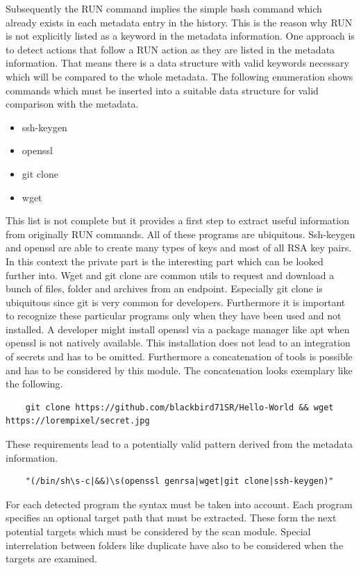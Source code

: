 Subsequently the RUN command implies the simple bash command which already exists in each metadata entry in the history. 
This is the reason why RUN is not explicitly listed as a keyword in the metadata information. 
One approach is to detect actions that follow a RUN action as they are listed in the metadata information. 
That means there is a data structure with valid keywords necessary which will be compared to the whole metadata.
The following enumeration shows commands which must be inserted into a suitable data structure for valid comparison with the metadata.
\begin{itemize}
\item ssh-keygen
\item openssl
\item git clone
\item wget
\end{itemize}
This list is not complete but it provides a first step to extract useful information from originally RUN commands. 
All of these programs are ubiquitous.
Ssh-keygen and openssl are able to create many types of keys and most of all RSA key pairs. 
In this context the private part is the interesting part which can be looked further into.
Wget and git clone are common utils to request and download a bunch of files, folder and archives from an endpoint. 
Especially git clone is ubiquitous since git is very common for developers.
Furthermore it is important to recognize these particular programs only when they have been used and not installed.
A developer might install openssl via a package manager like apt when openssl is not natively available.
This installation does not lead to an integration of secrets and has to be omitted.
Furthermore a concatenation of tools is possible and has to be considered by this module. 
The concatenation looks exemplary like the following.
\begin{lstlisting}
	git clone https://github.com/blackbird71SR/Hello-World && wget https://lorempixel/secret.jpg
\end{lstlisting}

These requirements lead to a potentially valid pattern derived from the metadata information.
\begin{lstlisting}
	"(/bin/sh\s-c|&&)\s(openssl genrsa|wget|git clone|ssh-keygen)"
\end{lstlisting}

For each detected program the syntax must be taken into account. 
Each program specifies an optional target path that must be extracted. 
These form the next potential targets which must be considered by the scan module. 
Special interrelation between folders like duplicate have also to be considered when the targets are examined.

